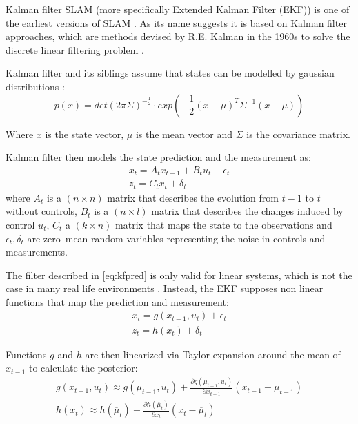 Kalman filter SLAM (more specifically Extended Kalman Filter (EKF)) is one of the earliest versions of SLAM . As its name suggests it is based on Kalman filter approaches, which are methods devised by R.E. Kalman in the 1960s to solve the discrete linear filtering problem . 

Kalman filter and its siblings assume that states can be modelled by gaussian distributions :
\begin{equation}
  p(x) = det(2\pi\Sigma)^{-\frac{1}{2}}\cdot exp({-\frac{1}{2}(x-\mu)^T\Sigma^{-1}(x-\mu)})
  \label{eq:gauss}
\end{equation}  

Where $x$ is the state vector, $\mu$ is the mean vector and $\Sigma$ is the covariance matrix.

Kalman filter then models the state prediction and the measurement as:
\begin{gather}
  x_t = A_tx_{t-1} + B_tu_t + \epsilon_t \\
  z_t = C_tx_t + \delta_t 
  \label{eq:kfpred}
\end{gather}  
where $A_t$ is a $(n\times n)$ matrix that describes the evolution from $t-1$ to $t$ without controls, $B_t$ is a $(n\times l)$ matrix that describes the changes induced by control $u_t$, $C_t$ a $(k\times n)$ matrix that maps the state to the observations and $\epsilon_t,\delta_t$ are zero--mean random variables representing the noise in controls and measurements.

The filter described in \autoref{eq:kfpred} is only valid for linear systems, which is not the case in many real life environments . Instead, the EKF supposes non linear functions that map the prediction and measurement:
\begin{gather}
  x_t = g(x_{t-1},u_t) + \epsilon_t \\
  z_t = h(x_t) + \delta_t
  \label{eq:ekf}
\end{gather}

Functions $g$ and $h$ are then linearized via Taylor expansion around the mean of $x_{t-1}$ to calculate the posterior:
\begin{gather}
  g(x_{t-1},u_t) \approx g(\mu_{t-1},u_t) + \frac{\partial g(\mu_{t-1},u_t)}{\partial x_{t-1}}(x_{t-1}-\mu_{t-1})\\ 
  h(x_t) \approx h(\overline{\mu}_t) +  \frac{\partial h(\overline{\mu}_t)}{\partial x_t}(x_t - \overline{\mu}_t) 
  \label{eq:taylor}
\end{gather} 

